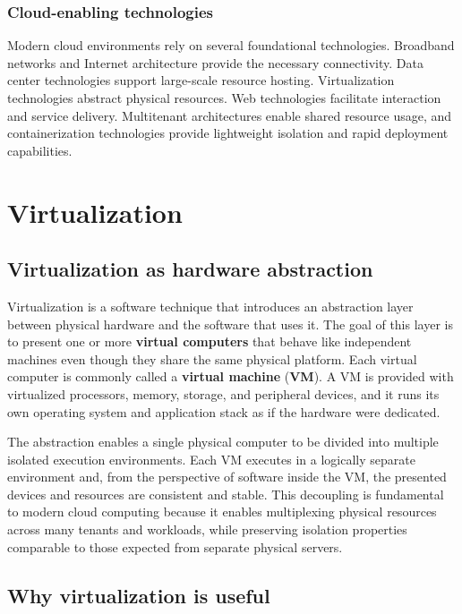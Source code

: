 \documentclass[11pt,a4paper,openany]{report}
\begin{document}
\subsection{Cloud-enabling technologies}

Modern cloud environments rely on several foundational technologies. Broadband networks and Internet architecture provide the necessary connectivity. Data center technologies support large-scale resource hosting. Virtualization technologies abstract physical resources. Web technologies facilitate interaction and service delivery. Multitenant architectures enable shared resource usage, and containerization technologies provide lightweight isolation and rapid deployment capabilities.

\chapter{Virtualization}

\section{Virtualization as hardware abstraction}

Virtualization is a software technique that introduces an abstraction layer between physical hardware and the software that uses it. The goal of this layer is to present one or more \textbf{virtual computers} that behave like independent machines even though they share the same physical platform. Each virtual computer is commonly called a \textbf{virtual machine} (\textbf{VM}). A VM is provided with virtualized processors, memory, storage, and peripheral devices, and it runs its own operating system and application stack as if the hardware were dedicated.

The abstraction enables a single physical computer to be divided into multiple isolated execution environments. Each VM executes in a logically separate environment and, from the perspective of software inside the VM, the presented devices and resources are consistent and stable. This decoupling is fundamental to modern cloud computing because it enables multiplexing physical resources across many tenants and workloads, while preserving isolation properties comparable to those expected from separate physical servers.

\section{Why virtualization is useful}
\end{document}
